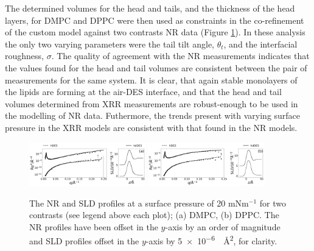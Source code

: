 \documentclass[%
 reprint,
 amsmath,amssymb,
 prl,
]{revtex4-1}
\begin{document}
The determined volumes for the head and tails, and the thickness of the head layers, for DMPC and DPPC were then used as constraints in the co-refinement of the custom model against two contrasts NR data (Figure \ref{fig:neutron}). In these analysis the only two varying parameters were the tail tilt angle, $\theta_t$, and the interfacial roughness, $\sigma$.
The quality of agreement with the NR measurements indicates that the values found for the head and tail volumes are consistent between the pair of measurements for the same system.
It is clear, that again stable monolayers of the lipids are forming at the air-DES interface, and that the head and tail volumes determined from XRR measurements are robust-enough to be used in the modelling of NR data.
Futhermore, the trends present with varying surface pressure in the XRR models are consistent with that found in the NR models.
%
\begin{figure}
	\centering
	\includegraphics[width=0.45\textwidth]{figures/dmpc_20n_ref_sld}
	\includegraphics[width=0.45\textwidth]{figures/dppc_20n_ref_sld}
	\caption{The NR and SLD profiles at a surface pressure of 20 mNm$^{-1}$ for two contrasts (see legend above each plot); (a) DMPC, (b) DPPC. The NR profiles have been offset in the $y$-axis by an order of magnitude and SLD profiles offset in the $y$-axis by \SI{5e-6}{\per\square\angstrom}, for clarity.}
	\label{fig:neutron}
\end{figure}
%
%
\end{document}
